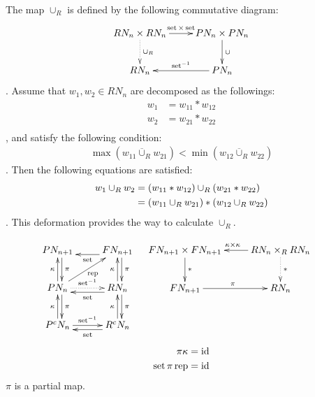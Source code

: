 The map $\cup_R$ is defined by the following commutative diagram:
\begin{equation}\xymatrix{
	RN_n\times RN_n \ar[r]^{\myop{set}\times\myop{set}} \ar@{.>}[d]^{\cup_R}
		& PN_n\times PN_n \ar[d]^{\cup} \\
	RN_n \ar@{<-}[r]^{\myop{set}^{-1}} & PN_n \\
}\end{equation}
. Assume that $w_1,w_2\in RN_n$ are decomposed as the followings:
\begin{equation}\begin{split}
	w_1 &= w_{11} * w_{12} \\
	w_2 &= w_{21} * w_{22} \\
\end{split}\end{equation}
, and satisfy the following condition:
\begin{equation}\begin{split}
	\max(w_{11} \overline{\cup}_R w_{21}) < \min(w_{12} \overline{\cup}_R w_{22})
\end{split}\end{equation}
. Then the following equations are satisfied:
\begin{equation}\begin{split}
	w_1 \cup_R w_2 &= \left({w_{11} * w_{12}}\right) \cup_R \left({w_{21} * w_{22}}\right) \\
		&= \left({w_{11} \cup_R w_{21}}\right) * \left({w_{12} \cup_R w_{22}}\right) \\
\end{split}\end{equation}
. This deformation provides the way to calculate $\cup_R$.

\begin{equation}\begin{split}
\xymatrix{
	PN_{n+1} \ar@<1ex>[d]^{\pi}
		& FN_{n+1} \ar@<1ex>[l]^{\myop{set}} \ar@<1ex>[d]^{\pi} \\
	PN_n \ar@{.>}[r]^{\myop{set}^{-1}} \ar[ur]_{\myop{rep}} \ar@<1ex>[d]^{\pi} \ar[u]^{\kappa}
		& RN_n \ar@<1ex>[l]^{\myop{set}} \ar@<1ex>[d]^{\pi} \ar[u]^{\kappa} \\
	P^cN_n \ar[r]^{\myop{set}^{-1}} \ar[u]^{\kappa} 
		& R^cN_n \ar@<1ex>[l]^{\myop{set}} \ar[u]^{\kappa} \\
} &\quad \xymatrix{
	FN_{n+1}\times FN_{n+1} \ar@{<-}[r]^{\kappa\times \kappa} \ar[d]^{*} 
		& RN_n\times_R RN_n \ar@{.>}[d]^{*} \\
	FN_{n+1} \ar[r]^{\pi} & RN_n \\
}
\end{split}\end{equation}
\begin{equation}\begin{split}
	\pi\kappa &= \operatorname{id} \\
	\operatorname{set}\pi\operatorname{rep} &= \operatorname{id} \\
\end{split}\end{equation}
$\pi$ is a partial map.

